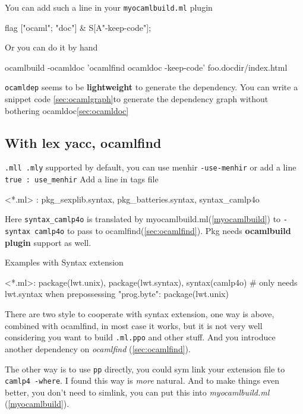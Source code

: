 You can add such a line in your \verb|myocamlbuild.ml| plugin

\begin{ocamlcode}
flag ["ocaml"; "doc"] & S[A"-keep-code"];
\end{ocamlcode}

Or you can do it by hand

\begin{bashcode}
ocamlbuild -ocamldoc 'ocamlfind ocamldoc -keep-code' foo.docdir/index.html
\end{bashcode}

\verb|ocamldep| seems to be \textbf{ lightweight} to generate the
dependency.  You can write a snippet code \ref{sec:ocamlgraph}to
generate the dependency graph without bothering ocamldoc\ref{sec:ocamldoc}





\subsection{With lex yacc, ocamlfind }
\verb|.mll .mly| supported by default, you can use menhir
\verb|-use-menhir| or add a line \verb|true : use_menhir|
Add a line in tags file

\begin{bashcode}
<*.ml> : pkg_sexplib.syntax, pkg_batteries.syntax, syntax_camlp4o
\end{bashcode}

Here \verb|syntax_camlp4o| is translated by
myocamlbuild.ml(\ref{myocamlbuild}) to \verb|-syntax camlp4o| to pass
to ocamlfind(\ref{sec:ocamlfind}). Pkg needs \textbf{ocamlbuild
  plugin} support as well.

Examples with Syntax extension

\begin{bashcode}
<*.ml>: package(lwt.unix), package(lwt.syntax), syntax(camlp4o) # only needs lwt.syntax when prepossessing
"prog.byte": package(lwt.unix)
\end{bashcode}

There are two style to cooperate with syntax extension, one way is
above, combined with ocamlfind, in most case it works, but it is not
very well considering you want to build \verb|.ml.ppo| and other
stuff. And you introduce another dependency on \textit{ocamlfind}
(\ref{sec:ocamlfind}).

The other way is to use \verb|pp| directly, you could sym link your
extension file to \verb|camlp4 -where|. I found this way is
\textit{more} natural. And to make things even better, you don't need
to simlink, you can put this into \textit{myocamlbuild.ml}
(\ref{myocamlbuild}).

